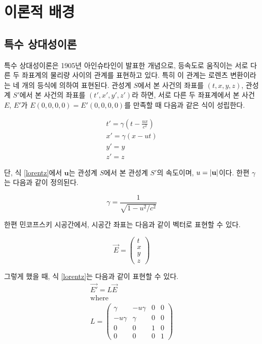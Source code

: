 \documentclass{thesis-SJ}
\begin{document}
\chapter{이론적 배경}

\section{특수 상대성이론}
특수 상대성이론은 1905년 아인슈타인이 발표한 개념으로, 등속도로 움직이는 서로 다른 두 좌표계의 물리량 사이의 관계를 표현하고 있다. 특히 이 관계는 로렌츠 변환이라는 네 개의 등식에 의하여 표현된다. 관성계 $S$에서 본 사건의 좌표를 $(t,x,y,z)$, 관성계 $S'$에서 본 사건의 좌표를 $(t', x',y',z')$라 하면, 서로 다른 두 좌표계에서 본 사건 $E$, $E'$가 $E(0,0,0,0)=E'(0,0,0,0)$를 만족할 때 다음과 같은 식이 성립한다.

\begin{equation}
\begin{gathered}
t' = \gamma(t-\frac{ux}{c^2}) \\
x' = \gamma(x-ut) \\
y' = y \\
z' = z
\end{gathered} \label{lorentz}
\end{equation}
 
단, 식 \eqref{lorentz}에서 $\mathbf{u}$는 관성계 $S$에서 본 관성계 $S'$의 속도이며, $u=\abs{\mathbf{u}}$이다. 한편 $\gamma$는 다음과 같이 정의된다.

\begin{equation*}
	\gamma = \frac{1}{\sqrt{1-u^2/c^2}}
\end{equation*} 

한편 민코프스키 시공간에서, 시공간 좌표는 다음과 같이 벡터로 표현할 수 있다.

\begin{equation}
	\vec{E} = \begin{pmatrix}
	t \\ x \\ y \\ z
	\end{pmatrix}
\end{equation}

그렇게 했을 때, 식 \eqref{lorentz}는 다음과 같이 표현할 수 있다.
\begin{equation}
	\begin{gathered}
	\vec{E'}=L\vec{E}
	\\
    \text{where} \\
	L = \begin{pmatrix}
	\gamma & -u\gamma & 0 & 0 \\
	-u\gamma & \gamma & 0 & 0 \\
	0 & 0 & 1 & 0 \\
	0 & 0 & 0 & 1
	\end{pmatrix}
	\end{gathered} \label{lorentzmat}
\end{equation}
\end{document}
